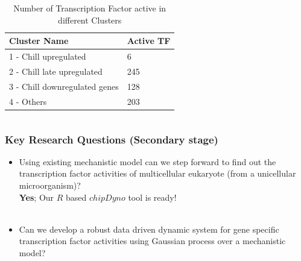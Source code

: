 \documentclass{beamer}
\begin{document}
\begin{frame}
\begin{columns}[c]

\begin{table}
\begin{tabular}{l l }
\toprule
\textbf{{\color{red}Cluster} \color{blue}Name} & \textbf{Active TF} \\
\midrule

{\color{red}1} - {\color{blue}Chill upregulated} & 6 \\ 
{\color{red}2} - {\color{blue}Chill late upregulated} & 245 \\ 
{\color{red}3} - {\color{blue}Chill downregulated genes} & 128 \\
{\color{red}4} - {\color{blue} Others} & 203 \\

\bottomrule
\end{tabular}
\caption{Number of Transcription Factor active in different Clusters}
\end{table}

\end{columns}
\end{frame}



\begin{frame}
\frametitle{Key Research Questions (Secondary stage)}
\begin{itemize} 
\item  Using existing mechanistic model can we step forward to find out the transcription factor activities of multicellular eukaryote (from a unicellular microorganism)? \\
\hfill {\color{green}\textbf{Yes}; Our $R$ based $chipDyno$ tool is ready!} \\~\\
\item {Can we develop a robust data driven dynamic system for gene specific transcription factor activities using Gaussian process over a mechanistic model?} 

\end{itemize}
\end{frame}

\end{document}
